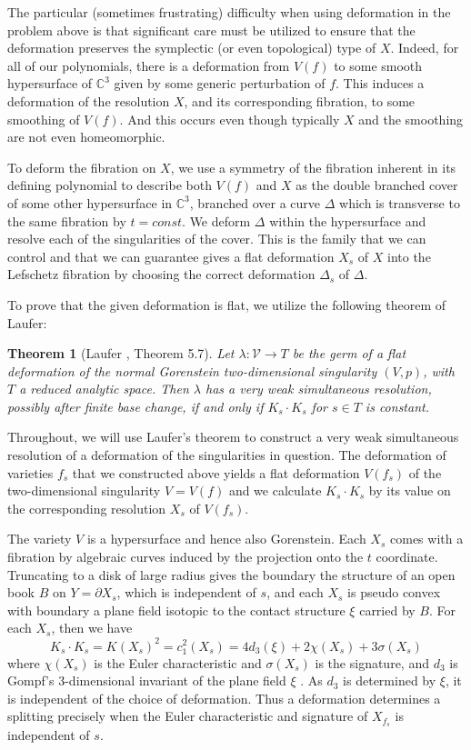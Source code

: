 \documentclass[11pt,letterpaper,reqno]{amsart}
\newtheorem{theorem}{Theorem}[section]
\theoremstyle{remark}
\def \bdry {\partial}
\newcommand{\CC}{{\mathbb C}}
\begin{document}
The particular (sometimes frustrating) difficulty when using deformation in the problem above is that significant care must be utilized to ensure that the deformation preserves the symplectic (or even topological) type of $X$. Indeed, for all of our polynomials, there is a deformation from $V(f)$ to some smooth hypersurface of $\CC^3$ given by some generic perturbation of $f$. This induces a deformation of the resolution $X$, and its corresponding fibration, to some smoothing of $V(f)$. And this occurs even though typically $X$ and the smoothing are not even homeomorphic. 

To deform the fibration on $X$, we use a symmetry of the fibration inherent in its defining polynomial to describe both $V(f)$ and $X$ as the double branched cover of some other hypersurface in $\CC^3$, branched over a curve $\Delta$ which is transverse to the same fibration by $t=\mathit{const}$. We deform $\Delta$ within the hypersurface and resolve each of the singularities of the cover. This is the family that we can control and that we can guarantee gives a flat deformation $X_s$ of $X$ into the Lefschetz fibration by choosing the correct deformation $\Delta_s$ of $\Delta$.

To prove that the given deformation is flat, we utilize the following theorem of Laufer:

    \begin{theorem}[Laufer \cite{Laufer-weak}, Theorem 5.7]  \label{thm:laufer} Let $\lambda: \mathcal{V} \to T$ be the germ of a flat deformation of the normal Gorenstein two-dimensional singularity $(V,p)$, with $T$ a reduced analytic space. Then $\lambda$ has a very weak simultaneous resolution, possibly after finite base change, if and only if $K_s \cdot K_s$ for $s \in T$ is constant. 
    \end{theorem}

Throughout, we will use Laufer's theorem to construct a very weak simultaneous resolution of a deformation of the singularities in question. The deformation of varieties $f_s$ that we constructed above yields a flat deformation $V(f_s)$ of the two-dimensional singularity $V = V(f)$ and we calculate $K_s \cdot K_s$ by its value on the corresponding resolution $X_s$ of $V(f_s)$. 

The variety $V$ is a hypersurface and hence also Gorenstein. Each $X_s$ comes with a fibration by algebraic curves induced by the projection onto the $t$ coordinate. Truncating to a disk of large radius gives the boundary the structure of an open book $B$ on $Y = \bdry X_s$, which is independent of $s$, and each $X_s$ is pseudo convex with boundary a plane field isotopic to the contact structure $\xi$ carried by $B$. For each $X_s$, then we have 
\[K_s \cdot K_s = K(X_s)^2=c_1^2(X_s) = 4 d_3(\xi)+2\chi(X_s) + 3 \sigma(X_s) \label{eqn:gompf}\]
where $\chi(X_s)$ is the Euler characteristic and $\sigma(X_s)$ is the signature, and $d_3$ is Gompf's 3-dimensional invariant of the plane field $\xi$ \cite{Gompf}. As $d_3$ is determined by $\xi$, it is independent of the choice of deformation. Thus a deformation determines a splitting precisely when the Euler characteristic and signature of $X_{f_s}$ is independent of $s$.
\end{document}
